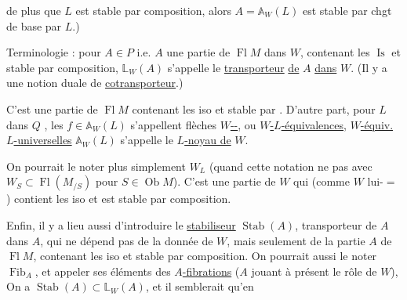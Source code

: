 de plus que  $L$ est stable par composition,
alors $A=\mathbb A_W(L)$ est stable par chgt de base
par $L$.)

Terminologie : pour $A\in P$ i.e. $A$ une
partie de $\operatorname{Fl} M$  dans $W$,
contenant les $\operatorname{Is}$ et stable par composition,
$\mathbb L_W(A)$ s'appelle le \uline{transporteur} \uline{de} $A$ \uline{dans} $W$.
(Il y a une notion duale de \uline{cotransporteur}.)

C'est  une partie de $\operatorname{Fl} M$ contenant les
iso et stable par . D'autre
part, pour $L$ dans $Q$ ,
les $f\in\mathbb A_W(L)$ s'appellent flèches \uline{$W$--},
ou \uline{$W$-$L$-équivalences},  \uline{$W$-équiv. $L$-universelles}
 $\mathbb A_W(L)$ s'appelle le \uline{$L$-noyau de} $W$.

On pourrait le noter plus simplement $W_L$
(quand cette notation ne  pas avec
$W_S\subset\operatorname{Fl}(M_{/S})$ pour $S\in\operatorname{Ob} M$). C'est une
partie de $W$ qui (comme $W$ lui-$=$)
contient les iso et est stable par composition.

Enfin, il y a lieu aussi d'introduire
le \uline{stabiliseur} $\operatorname{Stab}(A)$,  transporteur de
$A$ dans $A$, qui ne dépend pas de la donnée
de $W$, mais seulement de la partie $A$ de
$\operatorname{Fl} M$, contenant les iso et stable par composition.
 On pourrait aussi le noter $\operatorname{Fib}_A$, et
appeler ses éléments des \uline{$A$-fibrations} ($A$ jouant à
présent le rôle de $W$), 
On a $\operatorname{Stab}(A)\subset\mathbb L_W(A)$, et il semblerait qu'en
